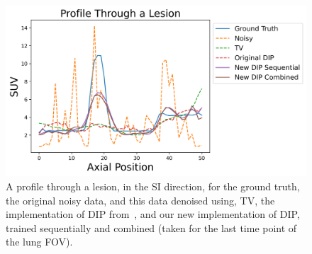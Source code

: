         \begin{figure}
            \centering
            
            \includegraphics[width=1.0\linewidth]{figures/deep_image_prior_results_profile.png}
            
            \captionsetup{singlelinecheck=false}
            \caption{
                A profile through a lesion, in the \gls{SI} direction, for the ground truth, the original noisy data, and this data denoised using, \gls{TV}, the implementation of \gls{DIP} from~\parencite{Gong2019PETPrior}, and our new implementation of \gls{DIP}, trained sequentially and combined (taken for the last time point of the lung \gls{FOV}).
            }
            \label{fig:pseudo_bayesian_dip_denoising_as_a_preprocessing_step_for_kinetic_modelling_in_dynamic_pet_appendix_results_profile}
        \end{figure}
        
